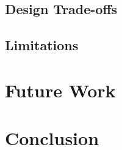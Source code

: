 \documentclass[12pt, a4paper, ukenglish]{article}
\begin{document}
    
    \subsection{Design Trade-offs} \label{sec: trade-offs}

    
    \subsection{Limitations} \label{sec: limitations}

\section{Future Work} \label{sec: future work}

    
\section{Conclusion} \label{sec: conclusion}



\newpage
{}
\printbibliography
\end{document}
